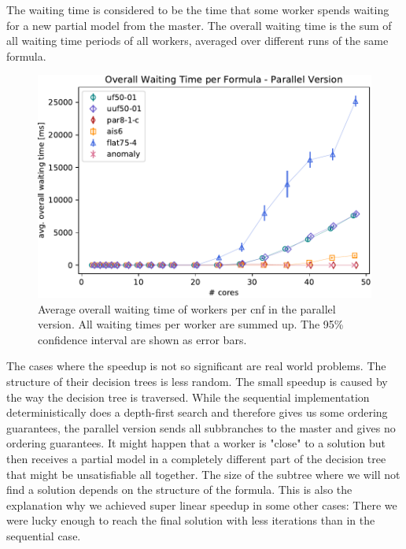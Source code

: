 \documentclass[letterpaper]{article}
\begin{document}
The waiting time is considered to be the time that some worker spends waiting for a new partial model from the master.
The overall waiting time is the sum of all waiting time periods of all workers, averaged over different runs of the same formula.
\begin{figure}
	\centering
	\includegraphics[width=\columnwidth]{figures/waiting_parallel_subset_dpll_scaling_tar.pdf}
	\caption{Average overall waiting time of workers per cnf in the parallel version.
		All waiting times per worker are summed up.
		The 95\% confidence interval are shown as error bars.}
	\label{fig:dpll_parallel_waiting}
\end{figure}

The cases where the speedup is not so significant are real world problems.
The structure of their decision trees is less random.
The small speedup is caused by the way the decision tree is traversed.
While the sequential implementation deterministically does a depth-first search and therefore gives us some ordering guarantees,
the parallel version sends all subbranches to the master and gives no ordering guarantees.
It might happen that a worker is "close" to a solution but then receives a partial model in a completely different part of the decision tree that might be unsatisfiable all together.
The size of the subtree where we will not find a solution depends on the structure of the formula.
This is also the explanation why we achieved super linear speedup in some other cases:
There we were lucky enough to reach the final solution with less iterations than in the sequential case.
\end{document}

